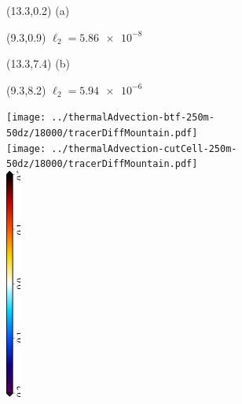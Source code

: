 \documentclass{article}
\begin{document}
\TPMargin{3pt}
\begin{textblock}{1.5}(13.3,0.2)
\normalsize
\centering
(a)
\end{textblock}
\begin{textblock}{5.5}(9.3,0.9)
\normalsize
$\ell_2 = \num{5.86e-8}$
\end{textblock}
\begin{textblock}{1.5}(13.3,7.4)
\normalsize
\centering
(b)
\end{textblock}
\begin{textblock}{5.5}(9.3,8.2)
\normalsize
$\ell_2 = \num{5.94e-6}$
\end{textblock}
\centering
\texttt{[image: ../thermalAdvection-btf-250m-50dz/18000/tracerDiffMountain.pdf]} \\
\vspace*{0.1in}
\texttt{[image: ../thermalAdvection-cutCell-250m-50dz/18000/tracerDiffMountain.pdf]} \\
\includegraphics[height=3in,angle=270]{tracerDiffMountain_T_diff.eps}
\end{document}
